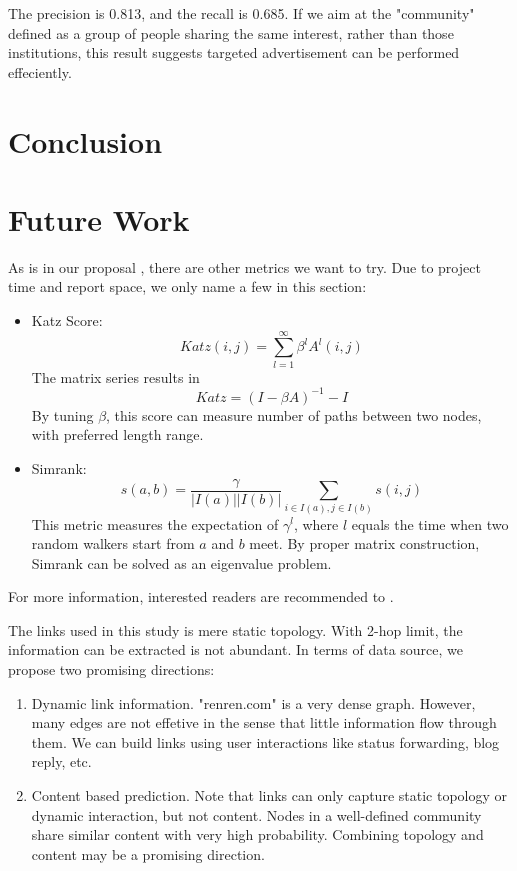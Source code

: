 \documentclass[11pt,a4paper]{article}
\begin{document}
The precision is 0.813, and the recall is 0.685. 
If we aim at the "community" defined as a group 
of people sharing the same interest, rather than 
those institutions, this result suggests targeted 
advertisement can be performed effeciently. 


\section{Conclusion}


\section{Future Work}

As is in our proposal \cite{hu2011-cd2hop}, there are other metrics
we want to try. Due to project time and report space, we only name 
a few in this section:
\begin{itemize}
	\item Katz Score:
			\begin{equation}
				Katz(i,j)=\sum_{l=1}^{\infty}{\beta^lA^l(i,j)}
			\end{equation}
			The matrix series results in 
			\begin{equation}
				Katz = (I-\beta A)^{-1} - I
			\end{equation}
			By tuning $\beta$, this score can measure number of paths between 
			two nodes, with preferred length range. 
	\item Simrank:
			\begin{equation}
				s(a,b)=\frac{\gamma}{|I(a)||I(b)|}
				\sum_{i \in I(a), j \in I(b)} s(i,j)
			\end{equation}
			This metric measures the expectation of $\gamma^l$, where $l$ equals 
			the time when two random walkers start from $a$ and $b$ meet. By proper 
			matrix construction, Simrank can be solved as an eigenvalue problem. 
\end{itemize}
For more information, interested readers are recommended to \cite{aggarwal2011social}. 

The links used in this study is mere static topology. 
With 2-hop limit, the information can be extracted 
is not abundant. In terms of data source, we propose 
two promising directions:
\begin{enumerate}
	\item Dynamic link information. "renren.com" is a very 
	dense graph. However, many edges are not effetive in the sense
	that little information flow through them. We can 
	build links using user interactions like status forwarding, 
	blog reply, etc. 
	\item Content based prediction. Note that links can only capture
	static topology or dynamic interaction, but not content. Nodes in a 
	well-defined community share similar content with very high 
	probability. Combining topology and content may be a promising 
	direction. 
\end{enumerate}
\end{document}
